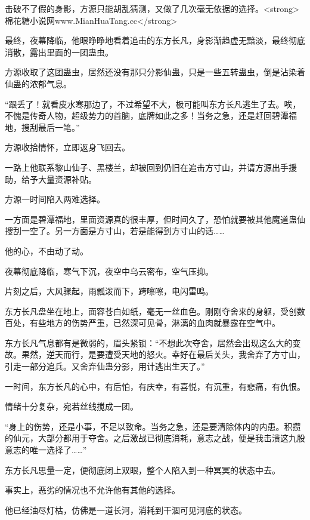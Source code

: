 
\begin{this_body}

击破不了假的身影，方源只能胡乱猜测，又做了几次毫无依据的选择。<strong>棉花糖小说网www.MianHuaTang.cc</strong>

最终，夜幕降临，他眼睁睁地看着追击的东方长凡，身影渐趋虚无黯淡，最终彻底消散，露出里面的一团蛊虫。

方源收取了这团蛊虫，居然还没有那只分影仙蛊，只是一些五转蛊虫，倒是沾染着仙蛊的浓郁气息。

“跟丢了！就看皮水寒那边了，不过希望不大，极可能叫东方长凡逃生了去。唉，不愧是传奇人物，超级势力的首脑，底牌如此之多！当务之急，还是赶回碧潭福地，搜刮最后一笔。”

方源收拾情怀，立即返身飞回去。

一路上他联系黎山仙子、黑楼兰，却被回到仍旧在追击方寸山，并请方源出手援助，给予大量资源补贴。

方源一时间陷入两难选择。

一方面是碧潭福地，里面资源真的很丰厚，但时间久了，恐怕就要被其他魔道蛊仙搜刮一空了。另一方面是方寸山，若是能得到方寸山的话……

他的心，不由动了动。

夜幕彻底降临，寒气下沉，夜空中乌云密布，空气压抑。

片刻之后，大风骤起，雨瓢泼而下，跨嚓嚓，电闪雷鸣。

东方长凡盘坐在地上，面容苍白如纸，毫无一丝血色。刚刚夺舍来的身躯，受创数百处，有些地方的伤势严重，已然深可见骨，淋漓的血肉就暴露在空气中。

东方长凡气息都有是微弱的，眉头紧锁：“不想此次夺舍，居然会出现这么大的变故。果然，逆天而行，是要遭受天地的怒火。幸好在最后关头，我舍弃了方寸山，引走一部分追兵。又舍弃仙蛊分影，用计逃出生天了。”

一时间，东方长凡的心中，有后怕，有庆幸，有喜悦，有沉重，有悲痛，有仇恨。

情绪十分复杂，宛若丝线搅成一团。

“身上的伤势，还是小事，不足以致命。当务之急，还是要清除体内的内患。积攒的仙元，大部分都用于夺舍。之后激战已彻底消耗，意志之战，便是我击溃这九股意志的唯一选择了……”

东方长凡思量一定，便彻底闭上双眼，整个人陷入到一种冥冥的状态中去。

事实上，恶劣的情况也不允许他有其他的选择。

他已经油尽灯枯，仿佛是一道长河，消耗到干涸可见河底的状态。


\end{this_body}

